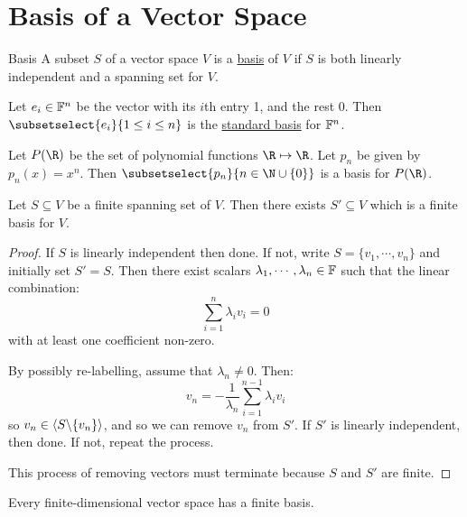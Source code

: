 \documentclass[../Main.tex]{subfiles}
\begin{document}
\section{Basis of a Vector Space}
\begin{definition}{Basis}
    A subset $S$ of a vector space $V$ is a \underline{basis} of $V$ if $S$ is both linearly independent and a spanning set for $V$.
\end{definition}
\begin{examples}
    \item Let $e_i \in \mathbb{F}^n$ be the vector with its $i$th entry 1, and the rest $0$. Then $\subsetselect{e_i}{1 \leq i \leq n}$ is the \underline{standard basis} for $\mathbb{F}^n$.
    \item Let $P(\R)$ be the set of polynomial functions $\R \mapsto \R$. Let $p_n$ be given by $p_n(x) = x^n$. Then $\subsetselect{p_n}{n \in \N \cup \{0\}}$ is a basis for $P(\R)$.
\end{examples}
\begin{proposition}
    Let $S \subseteq V$ be a finite spanning set of $V$. Then there exists $S' \subseteq V$ which is a finite basis for $V$.
    \label{propFinDimByBasis}
\end{proposition}
\begin{proof}
    If $S$ is linearly independent then done. If not, write $S = \{v_1, \cdots, v_n\}$ and initially set $S' = S$. Then there exist scalars $\lambda_1, \cdots, \lambda_n \in \mathbb{F}$ such that the linear combination:
    \begin{equation*}
        \sum_{i = 1}^n \lambda_i v_i = 0
    \end{equation*}
    with at least one coefficient non-zero.

    By possibly re-labelling, assume that $\lambda_n \neq 0$. Then:
    \begin{equation*}
        v_n = -\frac{1}{\lambda_n} \sum_{i = 1}^{n - 1} \lambda_i v_i
    \end{equation*}
    so $v_n \in \langle S \backslash \{v_n\} \rangle$, and so we can remove $v_n$ from $S'$. If $S'$ is linearly independent, then done. If not, repeat the process.

    This process of removing vectors must terminate because $S$ and $S'$ are finite.
\end{proof}
\begin{corollary}
    Every finite-dimensional vector space has a finite basis.
    \label{corFinDimByBasis}
\end{corollary}
\end{document}
